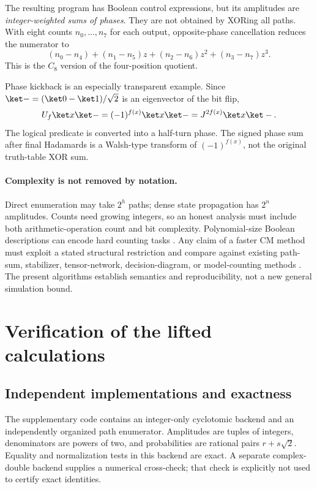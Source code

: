 The resulting program has Boolean control expressions, but its amplitudes are \emph{integer-weighted sums of phases}. They are not obtained by XORing all paths. With eight counts $n_0,\ldots,n_7$ for each output, opposite-phase cancellation reduces the numerator to
\begin{equation}
 (n_0-n_4)+(n_1-n_5)z+(n_2-n_6)z^2+(n_3-n_7)z^3.
\end{equation}
This is the $C_8$ version of the four-position quotient.

Phase kickback is an especially transparent example. Since $\ket-=(\ket0-\ket1)/\sqrt2$ is an eigenvector of the bit flip,
\begin{equation}
 U_f\ket x\ket-=(-1)^{f(x)}\ket x\ket-=J^{2f(x)}\ket x\ket-.
\end{equation}
The logical predicate is converted into a half-turn phase. The signed phase sum after final Hadamards is a Walsh-type transform of $(-1)^{f(x)}$, not the original truth-table XOR sum.

\paragraph{Complexity is not removed by notation.}
Direct enumeration may take $2^h$ paths; dense state propagation has $2^n$ amplitudes. Counts need growing integers, so an honest analysis must include both arithmetic-operation count and bit complexity. Polynomial-size Boolean descriptions can encode hard counting tasks \cite{dawson}. Any claim of a faster CM method must exploit a stated structural restriction and compare against existing path-sum, stabilizer, tensor-network, decision-diagram, or model-counting methods \cite{aaronson,markov,tdd,mei}. The present algorithms establish semantics and reproducibility, not a new general simulation bound.

\section{Verification of the lifted calculations}\label{sec:verification}
\subsection{Independent implementations and exactness}
The supplementary code contains an integer-only cyclotomic backend and an independently organized path enumerator. Amplitudes are tuples of integers, denominators are powers of two, and probabilities are rational pairs $r+s\sqrt2$. Equality and normalization tests in this backend are exact. A separate complex-double backend supplies a numerical cross-check; that check is explicitly not used to certify exact identities.

